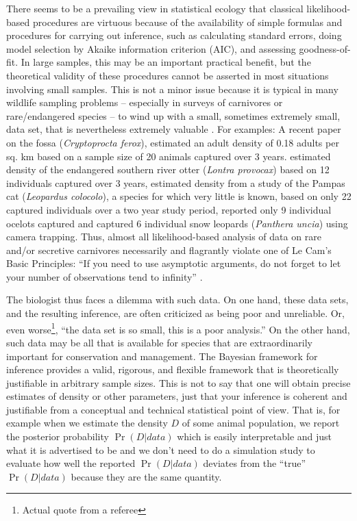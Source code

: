 There seems to be a prevailing view in statistical ecology that
classical likelihood-based procedures are virtuous because of the
availability of simple formulas and procedures for carrying out
inference, such as calculating standard errors, doing model selection
by Akaike information criterion (AIC), and assessing goodness-of-fit.  In large samples, this may be
an important practical benefit, but the theoretical validity of these
procedures cannot be asserted in most situations involving small
samples.  This is not a minor issue because it is typical in many
wildlife sampling problems -- especially in surveys of carnivores or
rare/endangered species -- to wind up with a small, sometimes extremely
small, data set, that is nevertheless extremely valuable
\citep{foster_harmsen:2012}. For examples: A recent paper
 \citep{hawkins_racey:2005}
 on the fossa
(\emph{Cryptoprocta ferox}), estimated
an adult density of 0.18 adults per sq. km based on a sample size of 20 animals captured
over 3 years. 
\citet{sepulveda_etal:2007}
 estimated density of the 
endangered southern river otter (\emph{Lontra provocax})
based on 12 individuals captured over 3
years,  
 \citet{gardner_etal:2010ecol} estimated 
density from a study of the Pampas cat (\emph {Leopardus colocolo}), a species for which very little
is known, based on only 22 captured individuals over 
a two year study period,   \citet{trolle_kery:2005} reported only 9 individual
ocelots captured and \citet{jackson_etal:2006} captured 6 individual
snow leopards (\emph{Panthera uncia}) using camera trapping. 
Thus, almost all likelihood-based
analysis of data on rare and/or
secretive carnivores necessarily and flagrantly violate one of Le
Cam's Basic Principles: ``If you need to use asymptotic
arguments, do not forget to let your number of observations tend to
infinity'' \citep{lecam:1990}.

The biologist thus faces a dilemma with such data. On one hand, these
data sets, and the resulting inference, are often criticized as being
poor and unreliable. Or, even worse\footnote{Actual quote from a
  referee}, ``the data set is so small, this is a poor analysis.''  On
the other hand, such data may be all that is available for species
that are extraordinarily important for conservation and management.
The Bayesian framework for inference provides a valid, rigorous, and
flexible framework that is theoretically justifiable in arbitrary
sample sizes. This is not to say that one will obtain precise
estimates of density or other parameters, just that your inference is
coherent and justifiable from a conceptual and technical statistical
point of view. That is, for example when we estimate the density $D$ of some animal population, we report the posterior probability
$\Pr(D|data)$ which is easily interpretable and just what it is
advertised to be and we don't need to do a simulation study to
evaluate how well the reported $\Pr(D|data)$ deviates from the
``true'' $\Pr(D|data)$ because they are the same quantity.

